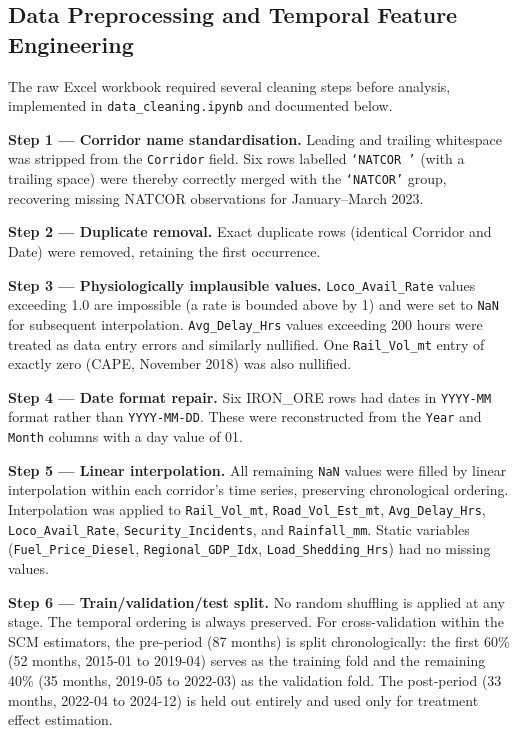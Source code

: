 \subsection{Data Preprocessing and Temporal Feature Engineering}
\label{sec:preprocessing}

The raw Excel workbook required several cleaning steps before
analysis, implemented in \texttt{data\_cleaning.ipynb} and
documented below.

\textbf{Step 1 --- Corridor name standardisation.}
Leading and trailing whitespace was stripped from the
\texttt{Corridor} field.
Six rows labelled \texttt{`NATCOR '} (with a trailing space) were
thereby correctly merged with the \texttt{`NATCOR'} group,
recovering missing NATCOR observations for January--March 2023.

\textbf{Step 2 --- Duplicate removal.}
Exact duplicate rows (identical Corridor and Date) were removed,
retaining the first occurrence.

\textbf{Step 3 --- Physiologically implausible values.}
\texttt{Loco\_Avail\_Rate} values exceeding 1.0 are impossible
(a rate is bounded above by 1) and were set to \texttt{NaN} for
subsequent interpolation.
\texttt{Avg\_Delay\_Hrs} values exceeding 200 hours were treated
as data entry errors and similarly nullified.
One \texttt{Rail\_Vol\_mt} entry of exactly zero (CAPE, November 2018)
was also nullified.

\textbf{Step 4 --- Date format repair.}
Six IRON\_ORE rows had dates in \texttt{YYYY-MM} format rather than
\texttt{YYYY-MM-DD}.
These were reconstructed from the \texttt{Year} and \texttt{Month}
columns with a day value of 01.

\textbf{Step 5 --- Linear interpolation.}
All remaining \texttt{NaN} values were filled by linear interpolation
within each corridor's time series, preserving chronological ordering.
Interpolation was applied to \texttt{Rail\_Vol\_mt},
\texttt{Road\_Vol\_Est\_mt}, \texttt{Avg\_Delay\_Hrs},
\texttt{Loco\_Avail\_Rate}, \texttt{Security\_Incidents}, and
\texttt{Rainfall\_mm}.
Static variables (\texttt{Fuel\_Price\_Diesel},
\texttt{Regional\_GDP\_Idx}, \texttt{Load\_Shedding\_Hrs}) had no
missing values.

\textbf{Step 6 --- Train/validation/test split.}
No random shuffling is applied at any stage.
The temporal ordering is always preserved.
For cross-validation within the SCM estimators, the pre-period
(87 months) is split chronologically: the first 60\% (52 months,
2015-01 to 2019-04) serves as the training fold and the remaining
40\% (35 months, 2019-05 to 2022-03) as the validation fold.
The post-period (33 months, 2022-04 to 2024-12) is held out
entirely and used only for treatment effect estimation.

